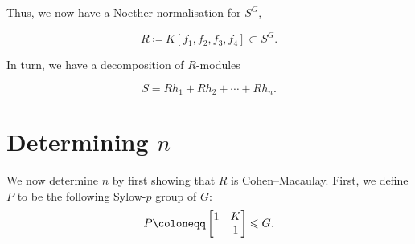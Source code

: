 \documentclass[12pt]{article}
\begin{document}





	Thus, we now have a Noether normalisation for $S^{G}$,
	\begin{tcolorbox}
		\begin{equation*} 
			R \coloneqq K[f_{1}, f_{2}, f_{3}, f_{4}] \subset S^{G}.
		\end{equation*}
	\end{tcolorbox}

	In turn, we have a decomposition of $R$-modules
	\begin{tcolorbox}
		\begin{equation*} 
			S = R h_{1} + R h_{2} + \cdots + R h_{n}.
		\end{equation*}
	\end{tcolorbox}

\section{Determining \texorpdfstring{$n$}{n}}

	We now determine $n$ by first showing that $R$ is Cohen--Macaulay. 
	First, we define $P$ to be the following Sylow-$p$ group of $G$:
	\begin{equation*} 
		P \coloneqq \two{1}{K}{}{1} \le G.
	\end{equation*}
\end{document}

